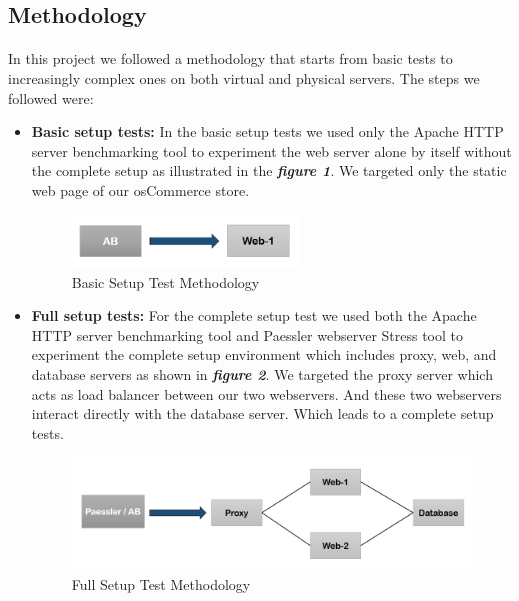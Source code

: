 \subsection{Methodology}
\paragraph{}
In this project we followed a methodology that starts from basic tests to increasingly complex ones on both virtual and physical servers. The steps we followed were:
\begin{itemize}
    \item \textbf{Basic setup tests:}
 In the basic setup tests we used only the Apache HTTP server benchmarking tool to experiment the web server alone by itself without the complete setup as illustrated in the \textbf{\textit{figure 1}}. 
 We targeted only the static web page of our osCommerce store.
 \begin{figure}[H]
    \centering
    \includegraphics[width=6cm]{Pictures/simple.PNG}
    \caption{Basic Setup Test Methodology}
    \label{fig:QQ3}
\end{figure}

    
    \item \textbf{Full setup tests:}
 For the complete setup test we used both the Apache HTTP server benchmarking tool and Paessler webserver Stress tool to experiment the complete setup environment which includes proxy, web, and database servers as shown in \textbf{\textit{figure 2}}. 
 We targeted the proxy server which acts as load balancer between our two webservers. And these two webservers interact directly with the database server. Which leads to a complete setup tests.   
 \begin{figure}[H]
    \centering
    \includegraphics[width=12cm]{Pictures/complex.PNG}
    \caption{Full Setup Test Methodology}
    \label{fig:QQ3}
\end{figure}
\end{itemize}
